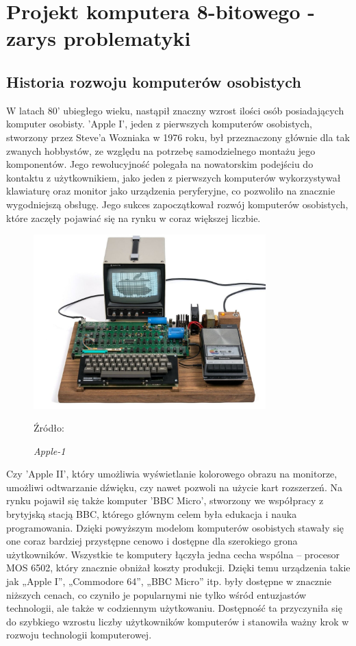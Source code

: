 \begingroup
\let\clearpage\relax
\chapter{Projekt komputera 8-bitowego - zarys problematyki}
\section{Historia rozwoju komputerów osobistych}

W latach 80' ubiegłego wieku, nastąpił znaczny wzrost ilości osób posiadających komputer osobisty. 'Apple I', jeden z pierwszych komputerów osobistych, stworzony przez Steve'a Wozniaka w 1976 roku, był przeznaczony głównie dla tak zwanych hobbystów, ze względu na potrzebę samodzielnego montażu jego komponentów. Jego rewolucyjność polegała na nowatorskim podejściu do kontaktu z użytkownikiem, jako jeden z pierwszych komputerów wykorzystywał klawiaturę oraz monitor jako urządzenia peryferyjne, co pozwoliło na znacznie wygodniejszą obsługę.  Jego sukces zapoczątkował rozwój komputerów osobistych, które zaczęły pojawiać się na rynku w coraz większej liczbie.
\begin{figure}[h]
    \centering
    \includegraphics[width=0.8\textwidth]{images/apple-1.jpg} %
    \caption{ \textit{Apple-1}}
    \label{fig:apple1} 
    \vspace{0.5em} %
    \footnotesize Źródło: \parencite{macrumors2016}
\end{figure}
Czy 'Apple II', który umożliwia wyświetlanie kolorowego obrazu na monitorze, umożliwi odtwarzanie dźwięku, czy nawet pozwoli na użycie kart rozszerzeń. Na rynku pojawił się także komputer 'BBC Micro', stworzony we współpracy z brytyjską stacją BBC, którego głównym celem była edukacja i nauka programowania. Dzięki powyższym modelom komputerów osobistych stawały się one coraz bardziej przystępne cenowo i dostępne dla szerokiego grona użytkowników.
Wszystkie te komputery łączyła jedna cecha wspólna – procesor MOS 6502, który znacznie obniżał koszty produkcji. Dzięki temu urządzenia takie jak „Apple I”, „Commodore 64”, „BBC Micro” itp. były dostępne w znacznie niższych cenach, co czyniło je popularnymi nie tylko wśród entuzjastów technologii, ale także w codziennym użytkowaniu. Dostępność ta przyczyniła się do szybkiego wzrostu liczby użytkowników komputerów i stanowiła ważny krok w rozwoju technologii komputerowej.

